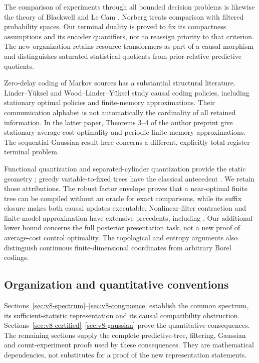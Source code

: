 The comparison of experiments through all bounded decision problems is
likewise the theory of Blackwell and Le Cam
\cite{Blackwell1953,LeCam1964,Torgersen1991}. Norberg
\cite{Norberg2002} treats comparison with filtered probability spaces.
Our terminal duality is proved to fix its compactness assumptions and
its encoder quantifiers, not to reassign priority to that criterion.
The new organization retains resource transformers as part of a causal
morphism and distinguishes saturated statistical quotients from
prior-relative predictive quotients.

Zero-delay coding of Markov sources has a substantial structural
literature. Linder--Y\"uksel \cite{LinderYuksel2014} and
Wood--Linder--Y\"uksel \cite{WoodLinderYuksel2017} study causal coding
policies, including stationary optimal policies and finite-memory
approximations. Their communication alphabet is not automatically the
cardinality of all retained information. In the latter paper, Theorems
3--4 of the author preprint give stationary average-cost optimality and
periodic finite-memory approximations. The sequential Gaussian result
here concerns a different, explicitly total-register terminal problem.

Functional quantization and separated-cylinder quantization provide the
static geometry \cite{LuschgyPages2004,Roychowdhury2014,KZ2017}; greedy
variable-to-fixed trees have the classical antecedent
\cite{Tunstall1967}. We retain those attributions. The robust factor
envelope proves that a near-optimal finite tree can be compiled without
an oracle for exact comparisons, while its suffix closure makes both
causal updates executable. Nonlinear-filter contraction and finite-model
approximation have extensive precedents, including
\cite{DKYAC2024}. Our additional lower bound concerns the full posterior
presentation task, not a new proof of average-cost control optimality.
The topological and entropy arguments also distinguish continuous
finite-dimensional coordinates from arbitrary Borel codings.

\subsection{Organization and quantitative conventions}
Sections~\ref{sec:v8-spectrum}--\ref{sec:v8-congruence} establish the
common spectrum, its sufficient-statistic representation and its causal
compatibility obstruction. Sections~\ref{sec:v8-certified}--\ref{sec:v8-gaussian}
prove the quantitative consequences. The remaining sections supply the
complete predictive-tree, filtering, Gaussian and count-experiment
proofs used by these consequences. They are mathematical dependencies,
not substitutes for a proof of the new representation statements.

